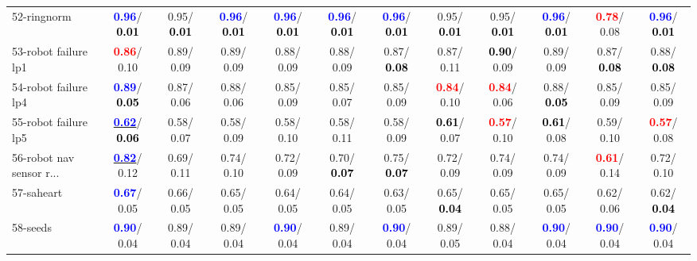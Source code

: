 \begin{table}[h]
\begin{center}
{\begin{tabular}{lc|c|c|c|c|c|c|c|c|c|c}
52-ringnorm & \textcolor{blue}{\textbf{  0.96}}/\textcolor{black}{\textbf{  0.01}} &   0.95/\textcolor{black}{\textbf{  0.01}} & \textcolor{blue}{\textbf{  0.96}}/\textcolor{black}{\textbf{  0.01}} & \textcolor{blue}{\textbf{  0.96}}/\textcolor{black}{\textbf{  0.01}} & \textcolor{blue}{\textbf{  0.96}}/\textcolor{black}{\textbf{  0.01}} & \textcolor{blue}{\textbf{  0.96}}/\textcolor{black}{\textbf{  0.01}} &   0.95/\textcolor{black}{\textbf{  0.01}} &   0.95/\textcolor{black}{\textbf{  0.01}} & \textcolor{blue}{\textbf{  0.96}}/\textcolor{black}{\textbf{  0.01}} & \textcolor{red}{\textbf{  0.78}}/  0.08 & \textcolor{blue}{\textbf{  0.96}}/\textcolor{black}{\textbf{  0.01}} \\
53-robot failure lp1 & \textcolor{red}{\textbf{  0.86}}/  0.10 &   0.89/  0.09 &   0.89/  0.09 &   0.88/  0.09 &   0.88/  0.09 &   0.87/\textcolor{black}{\textbf{  0.08}} &   0.87/  0.11 & \textcolor{black}{\textbf{  0.90}}/  0.09 &   0.89/  0.09 &   0.87/\textcolor{black}{\textbf{  0.08}} &   0.88/\textcolor{black}{\textbf{  0.08}} \\ \hline
54-robot failure lp4 & \textcolor{blue}{\textbf{  0.89}}/\textcolor{black}{\textbf{  0.05}} &   0.87/  0.06 &   0.88/  0.06 &   0.85/  0.09 &   0.85/  0.07 &   0.85/  0.09 & \textcolor{red}{\textbf{  0.84}}/  0.10 & \textcolor{red}{\textbf{  0.84}}/  0.06 &   0.88/\textcolor{black}{\textbf{  0.05}} &   0.85/  0.09 &   0.85/  0.09 \\
55-robot failure lp5 & \underline{\textcolor{blue}{\textbf{  0.62}}}/\textcolor{black}{\textbf{  0.06}} &   0.58/  0.07 &   0.58/  0.09 &   0.58/  0.10 &   0.58/  0.11 &   0.58/  0.09 & \textcolor{black}{\textbf{  0.61}}/  0.07 & \textcolor{red}{\textbf{  0.57}}/  0.10 & \textcolor{black}{\textbf{  0.61}}/  0.08 &   0.59/  0.10 & \textcolor{red}{\textbf{  0.57}}/  0.08 \\
56-robot nav sensor r... & \underline{\textcolor{blue}{\textbf{  0.82}}}/  0.12 &   0.69/  0.11 &   0.74/  0.10 &   0.72/  0.09 &   0.70/\textcolor{black}{\textbf{  0.07}} &   0.75/\textcolor{black}{\textbf{  0.07}} &   0.72/  0.09 &   0.74/  0.09 &   0.74/  0.09 & \textcolor{red}{\textbf{  0.61}}/  0.14 &   0.72/  0.10 \\
57-saheart & \textcolor{blue}{\textbf{  0.67}}/  0.05 &   0.66/  0.05 &   0.65/  0.05 &   0.64/  0.05 &   0.64/  0.05 &   0.63/  0.05 &   0.65/\textcolor{black}{\textbf{  0.04}} &   0.65/  0.05 &   0.65/  0.05 &   0.62/  0.06 &   0.62/\textcolor{black}{\textbf{  0.04}} \\
58-seeds & \textcolor{blue}{\textbf{  0.90}}/  0.04 &   0.89/  0.04 &   0.89/  0.04 & \textcolor{blue}{\textbf{  0.90}}/  0.04 &   0.89/  0.04 & \textcolor{blue}{\textbf{  0.90}}/  0.04 &   0.89/  0.05 &   0.88/  0.04 & \textcolor{blue}{\textbf{  0.90}}/  0.04 & \textcolor{blue}{\textbf{  0.90}}/  0.04 & \textcolor{blue}{\textbf{  0.90}}/  0.04 \\

\end{tabular}}
\end{center}
\end{table}

